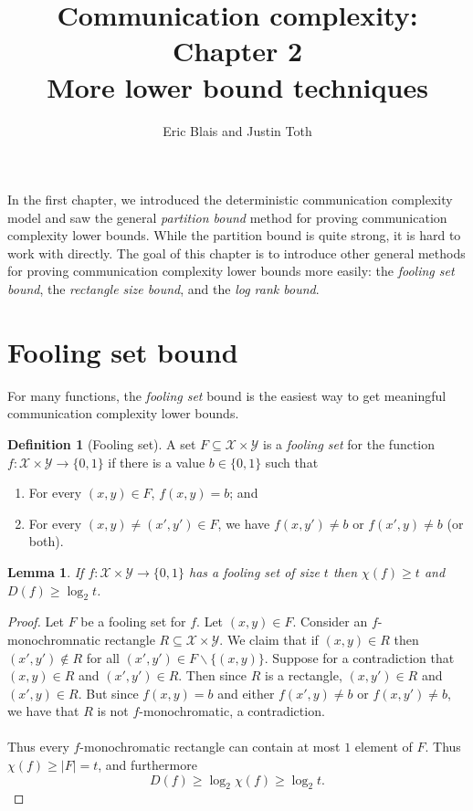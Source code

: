 \documentclass[11pt]{amsart}
\title{Communication complexity: Chapter 2 \\ More lower bound techniques}
\author{Eric Blais and Justin Toth}
\theoremstyle{plain}
\newtheorem{lemma}{Lemma}
\theoremstyle{definition}
\newtheorem{definition}{Definition}
\theoremstyle{plain}
\newcommand{\calX}{\mathcal{X}}
\newcommand{\calY}{\mathcal{Y}}
\begin{document}
\maketitle

In the first chapter, we introduced the deterministic communication complexity 
model and saw the general \emph{partition bound} method for proving communication complexity lower bounds. While the partition bound is quite strong, it is hard to work with directly. The goal of this chapter is to introduce other general methods for proving communication complexity lower bounds more easily: the \emph{fooling set bound}, the \emph{rectangle size bound}, and the \emph{log rank bound}.



\newpage \section{Fooling set bound}

For many functions, the \emph{fooling set} bound is the easiest way to get meaningful communication complexity lower bounds.

\begin{definition}[Fooling set]
A set $F \subseteq \calX \times \calY$ is a \emph{fooling set} for the function $f : \calX \times \calY \to \{0,1\}$ if there is a value $b \in \{0,1\}$ such that
\begin{enumerate}
\item For every $(x,y) \in F$, $f(x,y) = b$; and
\item For every $(x,y) \neq (x',y') \in F$, we have $f(x,y') \neq b$ or $f(x',y) \neq b$ (or both).
\end{enumerate}
\end{definition}

\begin{lemma}
If $f : \mathcal{X} \times \mathcal{Y} \to \{0,1\}$ has a fooling set of size $t$ then $\chi(f) \ge t$ and $D(f) \ge \log_2 t$.
\end{lemma}

\begin{proof}
Let $F$ be a fooling set for $f$. Let $(x,y) \in F$. Consider an $f$-monochromnatic rectangle $R \subseteq \mathcal{X}\times \mathcal{Y}$. We claim that if $(x,y) \in R$ then $(x',y') \not\in R$ for all $(x',y') \in F\backslash\{(x,y)\}$. Suppose for a contradiction that $(x,y) \in R$ and $(x',y') \in R$. Then since $R$ is a rectangle, $(x,y') \in R$ and $(x',y) \in R$. But since $f(x,y) = b$ and either $f(x',y) \neq b$ or $f(x,y') \neq b$, we have that $R$ is not $f$-monochromatic, a contradiction.
\paragraph{}
Thus every $f$-monochromatic rectangle can contain at most $1$ element of $F$. Thus $\chi(f) \geq |F| = t$, and furthermore
$$D(f) \geq \log_2\chi(f) \geq \log_2 t.$$
\end{proof}
\end{document}
